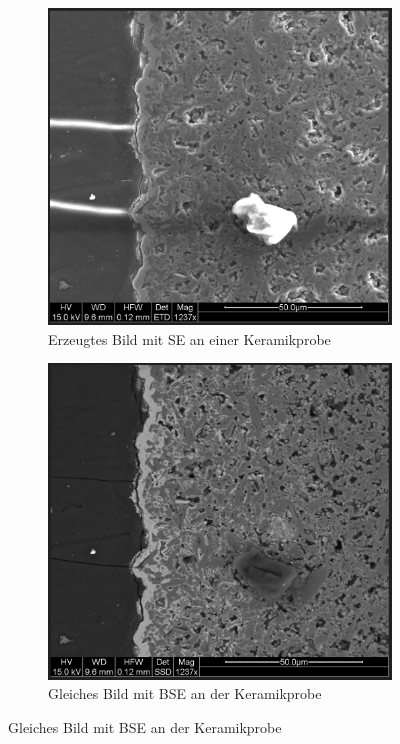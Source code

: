 \documentclass[12pt,english,ngerman]{scrartcl}
\begin{document}
\begin{figure}[H]
	\centering
	\begin{subfigure}{.45\linewidth}
		\includegraphics[width=\textwidth]{./figures/se.png}
		\caption{Erzeugtes Bild mit SE an einer Keramikprobe
		}\label{fig:se}
	\end{subfigure}
	\begin{subfigure}{.45\linewidth}
		\includegraphics[width=\textwidth]{./figures/bse.png}
		\caption{Gleiches Bild mit BSE an der Keramikprobe
		}\label{fig:bse}
	\end{subfigure}
\end{figure}
\end{document}
